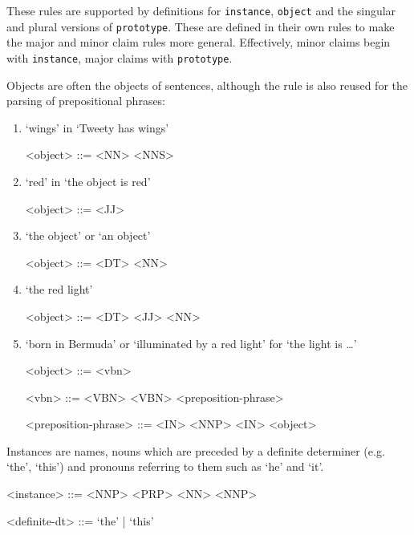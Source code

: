 \noindent These rules are supported by definitions for \texttt{instance}, \texttt{object} and the singular and plural versions of \texttt{prototype}. These are defined in their own rules to make the major and minor claim rules more general. Effectively, minor claims begin with \texttt{instance}, major claims with \texttt{prototype}.

Objects are often the objects of sentences, although the rule is also reused for the parsing of prepositional phrases:

\begin{enumerate}
    \item `wings' in `Tweety has wings'
    \begin{grammar}
        <object> ::= <NN> \alt <NNS>
    \end{grammar}

    \item `red' in `the object is red'
    \begin{grammar}
        <object> ::= <JJ>
    \end{grammar}

    \item `the object' or `an object'
    \begin{grammar}
        <object> ::= <DT> <NN>
    \end{grammar}

    \item `the red light'
    \begin{grammar}
        <object> ::= <DT> <JJ> <NN>
    \end{grammar}

    \item `born in Bermuda' or `illuminated by a red light' for `the light is …'
    \begin{grammar}
        <object> ::= <vbn>

        <vbn> ::= <VBN>
        \alt <VBN> <preposition-phrase>

        <preposition-phrase> ::= <IN> <NNP>
        \alt <IN> <object>
    \end{grammar}
\end{enumerate}

\noindent Instances are names, nouns which are preceded by a definite determiner (e.g. `the', `this') and pronouns referring to them such as `he' and `it'.

\begin{grammar}
<instance> ::= <NNP>
\alt <PRP>
 <NN>
 <NNP>

<definite-dt> ::= `the' | `this'
\end{grammar}

